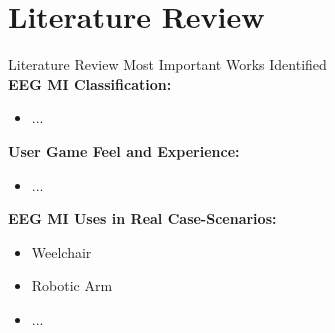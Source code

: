 \section{Literature Review}
\begin{frame}{Literature Review}
Most Important Works Identified\\
\textbf{EEG MI Classification:}
\begin{itemize}
    \item ...
\end{itemize}
\textbf{User Game Feel and Experience:}
\begin{itemize}
    \item ...
\end{itemize}
\textbf{EEG MI Uses in Real Case-Scenarios:}
\begin{itemize}
    \item Weelchair
    \item Robotic Arm
    \item ...
\end{itemize}
\end{frame}
